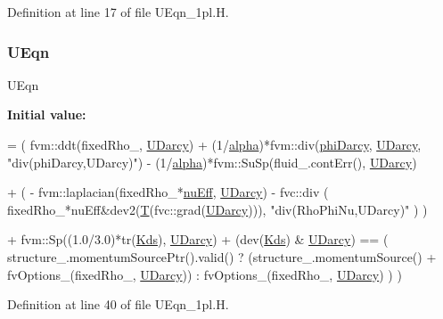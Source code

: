 Definition at line 17 of file U\+Eqn\+\_\+1pl.\+H.

\mbox{\label{UEqn__1pl_8H_a7a16102cab1f7398d9732830aeb173bc}} 
\subsubsection{\texorpdfstring{U\+Eqn}{UEqn}}
{\footnotesize\ttfamily U\+Eqn}

{\bfseries Initial value\+:}
\begin{DoxyCode}
=
(
        fvm::ddt(fixedRho\_, \hyperlink{UEqn__1pl_8H_a128902f421bd168fd4996f177e0a59ad}{UDarcy})
    +   (1/\hyperlink{UEqn__1pl_8H_a7fe02434a19f3e00e927f32adcbb193b}{alpha})*fvm::div(\hyperlink{UEqn__1pl_8H_a8d8b81e7b9e1aacc2219b33e188bbe8b}{phiDarcy}, \hyperlink{UEqn__1pl_8H_a128902f421bd168fd4996f177e0a59ad}{UDarcy}, \textcolor{stringliteral}{"div(phiDarcy,UDarcy)"})
    -   (1/\hyperlink{UEqn__1pl_8H_a7fe02434a19f3e00e927f32adcbb193b}{alpha})*fvm::SuSp(fluid\_.contErr(), \hyperlink{UEqn__1pl_8H_a128902f421bd168fd4996f177e0a59ad}{UDarcy})
        
    +   (
            -   fvm::laplacian(fixedRho\_*\hyperlink{UEqn__1pl_8H_a45b99c6eed207f4b52ba0f4a48682586}{nuEff}, \hyperlink{UEqn__1pl_8H_a128902f421bd168fd4996f177e0a59ad}{UDarcy})
            -   fvc::div
                (
                    fixedRho\_*nuEff&dev2(\hyperlink{EEqn__1p_8H_ad0f94aa7ea43d4be0bae24e3a89aad0c}{T}(fvc::grad(\hyperlink{UEqn__1pl_8H_a128902f421bd168fd4996f177e0a59ad}{UDarcy}))),
                    \textcolor{stringliteral}{"div(RhoPhiNu,UDarcy)"}
                )
        )
        
        
    +   fvm::Sp((1.0/3.0)*tr(\hyperlink{UEqn__1pl_8H_a1de2ec75382b1cf038f07c3bb9d58957}{Kds}), \hyperlink{UEqn__1pl_8H_a128902f421bd168fd4996f177e0a59ad}{UDarcy}) + (dev(\hyperlink{UEqn__1pl_8H_a1de2ec75382b1cf038f07c3bb9d58957}{Kds}) & \hyperlink{UEqn__1pl_8H_a128902f421bd168fd4996f177e0a59ad}{UDarcy})
    ==
    (
        structure\_.momentumSourcePtr().valid() ?
        (structure\_.momentumSource() + fvOptions\_(fixedRho\_, \hyperlink{UEqn__1pl_8H_a128902f421bd168fd4996f177e0a59ad}{UDarcy})) :
        fvOptions\_(fixedRho\_, \hyperlink{UEqn__1pl_8H_a128902f421bd168fd4996f177e0a59ad}{UDarcy})
    )
)
\end{DoxyCode}


Definition at line 40 of file U\+Eqn\+\_\+1pl.\+H.

